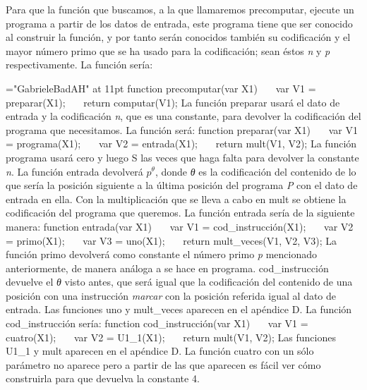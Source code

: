 Para que la función que buscamos, a la que llamaremos {\fgabrielen precomputar}, ejecute un
programa a partir de los datos de entrada, este programa tiene que ser conocido al construir la
función, y por tanto serán conocidos también su codificación y el mayor número primo que se ha
usado para la codificación; sean éstos {\it n} y {\it p} respectivamente. La función sería:

\font\fgabrielen="GabrieleBadAH" at 11pt
\cachosrec
function precomputar(var X1)
~~~var V1 = preparar(X1);
~~~return computar(V1);
\fincachos
La función preparar usará el dato de entrada y la codificación {\it n}, que es una cons\-tan\-te, para
devolver la codificación del programa que necesitamos. La función será:
\cachosrec
function preparar(var X1)
~~~var V1 = programa(X1);
~~~var V2 = entrada(X1);
~~~return mult(V1, V2);
\fincachos
La función {\fgabrielen programa} usará {\fgabrielen cero} y luego {\fgabrielen S} las veces que
haga falta para devolver la constante {\it n}. La función {\fgabrielen entrada} devolverá $ p^\theta
$, donde {\it θ\/} es la codificación del contenido de lo que sería la posición siguiente a la
última posición del programa {\it P} con el dato de entrada en ella. Con la multiplicación que se
lleva a cabo en {\fgabrielen mult} se obtiene la codificación del programa que queremos. La función
{\fgabrielen entrada} sería de la siguiente manera:
\cachosrec
function entrada(var X1)
~~~var V1 = cod\_instrucción(X1);
~~~var V2 = primo(X1);
~~~var V3 = uno(X1);
~~~return mult\_veces(V1, V2, V3);
\fincachos
La función {\fgabrielen primo} devolverá como constante el número primo {\it p} mencionado
anteriormente, de manera análoga a se hace en {\fgabrielen programa}. {\fgabrielen
cod\_instrucción} devuelve el {\it θ\/} visto antes, que será igual que la codificación del
contenido de una posición con una instrucción {\it marcar} con la posición referida igual al dato
de entrada. Las funciones {\fgabrielen uno} y {\fgabrielen mult\_veces} aparecen en el apéndice
D.  La función {\fgabrielen cod\_instrucción} sería:
\cachosrec
function cod\_instrucción(var X1)
~~~var V1 = cuatro(X1);
~~~var V2 = U1\_1(X1);
~~~return mult(V1, V2);
\fincachos
Las funciones {\fgabrielen U1\_1} y {\fgabrielen mult} aparecen en el apéndice D. La función
{\fgabrielen cuatro} con un sólo parámetro no aparece pero a partir de las que aparecen es fácil
ver cómo construirla para que devuelva la constante 4.

